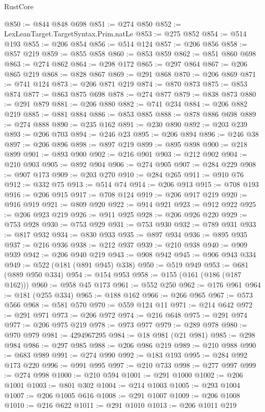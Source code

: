 \begin{lexlean}{RustCore}
\begin{coremodule}
@850 := @844 @848 @698
@851 := @274 @850
@852 := LexLeanTarget.TargetSyntax.Prim.natLe
@853 := @275 @852
@854 := @514 @193
@855 := @206 @854
@856 := @514 @124
@857 := @206 @856
@858 := @857 @219
@859 := @855 @858
@860 := @853 @859
@862 := @851 @860 @698
@863 := @274 @862
@864 := @298 @172
@865 := @297 @864
@867 := @206 @865 @219
@868 := @828 @867
@869 := @291 @868
@870 := @206 @869
@871 := @741 @124
@873 := @206 @871 @219
@874 := @870 @873
@875 := @853 @874
@877 := @863 @875 @698
@878 := @274 @877
@879 := @838 @873
@880 := @291 @879
@881 := @206 @880
@882 := @741 @234
@884 := @206 @882 @219
@885 := @881 @884
@886 := @853 @885
@888 := @878 @886 @698
@889 := @274 @888
@890 := @235 @162
@891 := @230 @890
@892 := @203 @239
@893 := @206 @703
@894 := @246 @23
@895 := @206 @894
@896 := @246 @38
@897 := @206 @896
@898 := @897 @219
@899 := @895 @898
@900 := @218 @899
@901 := @893 @900
@902 := @216 @901
@903 := @212 @902
@904 := @210 @903
@905 := @892 @904
@906 := @274 @905
@907 := @284 @229
@908 := @907 @173
@909 := @203 @270
@910 := @284 @265
@911 := @910 @76
@912 := @332 @75
@913 := @514 @74
@914 := @206 @913
@915 := @708 @193
@916 := @206 @915
@917 := @708 @124
@919 := @206 @917 @219
@920 := @916 @919
@921 := @809 @920
@922 := @914 @921
@923 := @912 @922
@925 := @206 @923 @219
@926 := @911 @925
@928 := @206 @926 @220
@929 := @753 @928
@930 := @753 @929
@931 := @753 @930
@932 := @789 @931
@933 := @817 @932
@934 := @830 @933
@935 := @897 @934
@936 := @895 @935
@937 := @216 @936
@938 := @212 @937
@939 := @210 @938
@940 := @909 @939
@942 := @206 @940 @219
@943 := @908 @942
@945 := @906 @943 @334
@949 := @522 (@181 (@891 @945) @338)
@950 := @519 @949
@953 := @681 (@889 @950 @334)
@954 := @154 @953
@958 := @155 (@161 (@186 (@187 @162)))
@960 := @958 @45 @173
@961 := @552 @250
@962 := @176 @961
@964 := @181 (@255 @334)
@965 := @188 @162
@966 := @266 @965
@967 := @573 @566
@968 := @581 @570
@970 := @559 @124 @11
@971 := @214 @642
@972 := @291 @971
@973 := @206 @972
@974 := @216 @648
@975 := @291 @974
@977 := @206 @975 @219
@978 := @973 @977
@979 := @289 @978
@980 := @970 @979
@981 := 4294967295
@984 := @18 @981 (@21 @981)
@985 := @298 @984
@986 := @297 @985
@988 := @206 @986 @219
@989 := @210 @988
@990 := @683 @989
@991 := @274 @990
@992 := @183 @193
@995 := @284 @992 @173 @220
@996 := @991 @995
@997 := @210 @733
@998 := @277 @997
@999 := @274 @998
@1000 := @210 @594
@1001 := @291 @1000
@1002 := @206 @1001
@1003 := @801 @302
@1004 := @214 @1003
@1005 := @293 @1004
@1007 := @206 @1005 @616
@1008 := @291 @1007
@1009 := @206 @1008
@1010 := @216 @622
@1011 := @291 @1010
@1013 := @206 @1011 @219

\end{coremodule}
\end{lexlean}
